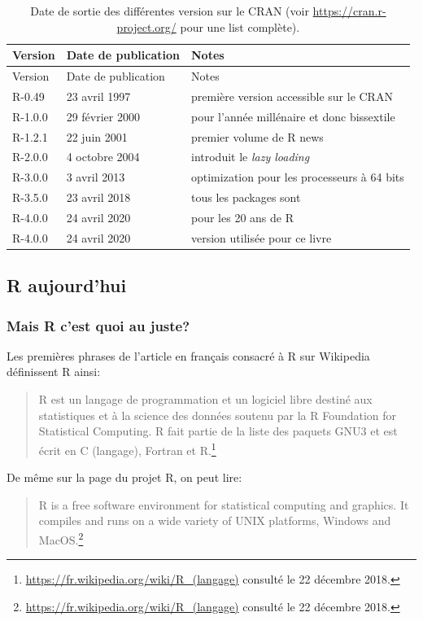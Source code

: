 \documentclass[]{article}
\begin{document}
\begin{longtable}[]{@{}lll@{}}
\caption{Date de sortie des différentes version sur le CRAN (voir \url{https://cran.r-project.org/} pour une list complète).}\tabularnewline
\toprule
Version & Date de publication & Notes\tabularnewline
\midrule
\endfirsthead
\toprule
Version & Date de publication & Notes\tabularnewline
\midrule
\endhead
R-0.49 & 23 avril 1997 & première version accessible sur le CRAN\tabularnewline
R-1.0.0 & 29 février 2000 & pour l'année millénaire et donc bissextile\tabularnewline
R-1.2.1 & 22 juin 2001 & premier volume de R news\tabularnewline
R-2.0.0 & 4 octobre 2004 & introduit le \emph{lazy loading}\tabularnewline
R-3.0.0 & 3 avril 2013 & optimization pour les processeurs à 64 bits\tabularnewline
R-3.5.0 & 23 avril 2018 & tous les packages sont\tabularnewline
R-4.0.0 & 24 avril 2020 & pour les 20 ans de R\tabularnewline
R-4.0.0 & 24 avril 2020 & version utilisée pour ce livre\tabularnewline
\bottomrule
\end{longtable}

\hypertarget{r-aujourdhui}{%
\subsection{R aujourd'hui}\label{r-aujourdhui}}

\hypertarget{mais-r-cest-quoi-au-juste}{%
\subsubsection{Mais R c'est quoi au juste?}\label{mais-r-cest-quoi-au-juste}}

Les premières phrases de l'article en français consacré à R sur Wikipedia définissent R ainsi:

\begin{quote}
R est un langage de programmation et un logiciel libre destiné aux statistiques et à la science des données soutenu par la R Foundation for Statistical Computing. R fait partie de la liste des paquets GNU3 et est écrit en C (langage), Fortran et R.\footnote{\url{https://fr.wikipedia.org/wiki/R_(langage)} consulté le 22 décembre 2018.}
\end{quote}

De même sur la page du projet R, on peut lire:

\begin{quote}
R is a free software environment for statistical computing and graphics. It compiles and runs on a wide variety of UNIX platforms, Windows and MacOS.\footnote{\url{https://fr.wikipedia.org/wiki/R_(langage)} consulté le 22 décembre 2018.}
\end{quote}
\end{document}
